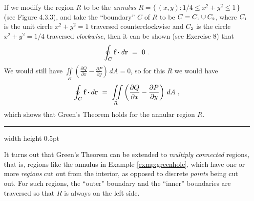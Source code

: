 If we modify the region $R$ to be the \emph{annulus} $R =\lbrace\,(x,y): 1/4 \le x^2 + y^2 \le 1\,\rbrace$ (see
Figure 4.3.3), and take the ``boundary'' $C$ of $R$ to be $C = C_{\scriptscriptstyle 1} \cup C_{\scriptscriptstyle 2}$,
where $C_{\scriptscriptstyle 1}$ is
the unit circle $x^2 + y^2 = 1$ traversed counterclockwise and $C_{\scriptscriptstyle 2}$ is the circle $x^2 + y^2 = 1/4$
traversed \emph{clockwise}, then it can be shown (see Exercise 8) that
\begin{displaymath}
 \oint_{C} \textbf{f} \bm{\cdot} d\textbf{r} ~=~ 0 ~.
\end{displaymath}
We would still have $\iint\limits_{R} \left( \frac{\partial Q}{\partial x} - \frac{\partial P}{\partial y} \right)\,dA
= 0$, so for this $R$ we would have
\begin{displaymath}
 \oint_{C} \textbf{f} \bm{\cdot} d\textbf{r} ~=~
 \iint\limits_{R} \left( \frac{\partial Q}{\partial x} - \frac{\partial P}{\partial y} \right)\,dA ~,
\end{displaymath}
which shows that Green's Theorem holds for the annular region $R$.\vspace{3mm}
\hrule width \textwidth height 0.5pt
\vspace{3mm}

It turns out that Green's Theorem can be extended to \emph{multiply connected} regions, that is, regions like
the annulus in Example \ref{exmp:greenhole}, which have one or more \emph{regions} cut out from the interior, as
opposed to discrete \emph{points} being cut out. For such
regions, the ``outer'' boundary and the ``inner'' boundaries are traversed so that $R$ is always on the left
side.\vspace{-1mm}

